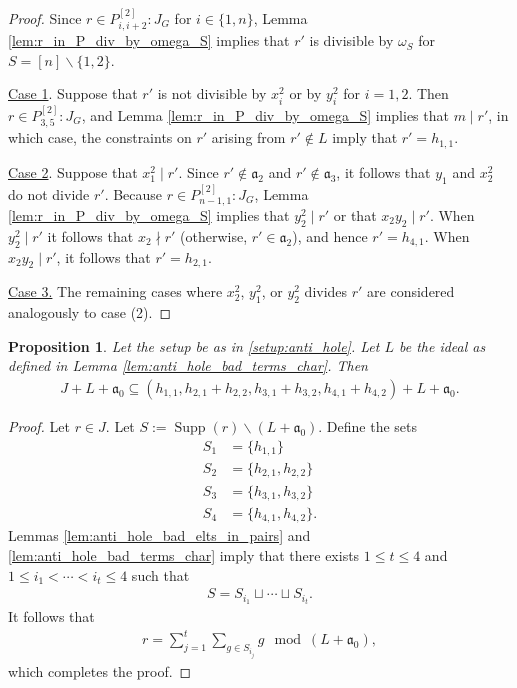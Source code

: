 \documentclass[12pt,a4paper]{amsart}
\theoremstyle{plain}
\newtheorem{prop}[thrm]{Proposition}
\def\bprop{\begin{prop}}
\def\eprop{\end{prop}}
\theoremstyle{definition}
\def\bproof{\begin{proof}}
\def\eproof{\end{proof}}
\theoremstyle{remark}
\let\setminus=\smallsetminus
\def\a{\mathfrak{a}}
\DeclareMathOperator{\Supp}{Supp}
\newcommand{\ul}[1]{\underline{#1}}
\renewcommand{\subset}{\subseteq}
\begin{document}
\bproof
Since $r \in P_{i,i+2}^{[2]}:J_{G}$ for $i \in \{1,n\}$, Lemma \ref{lem:r_in_P_div_by_omega_S} implies that $r'$ is divisible by $\omega_{S}$ for $S = [n] \setminus \{1,2\}$. 

\ul{Case 1}. Suppose that $r'$ is not divisible by $x_{i}^{2}$ or by $y_{i}^{2}$ for $i = 1,2$. Then $r \in P_{3,5}^{[2]}:J_{G}$, and Lemma \ref{lem:r_in_P_div_by_omega_S} implies that $m \mid r'$, in which case, the constraints on $r'$ arising from $r' \notin L$ imply that $r' = h_{1,1}$.

\ul{Case 2}. Suppose that $x_{1}^{2} \mid r'$. Since $r' \notin \a_{2}$ and $r' \notin \a_{3}$, it follows that $y_{1}$ and $x_{2}^{2}$ do not divide $r'$. Because $r \in P_{n-1,1}^{[2]}:J_{G}$, Lemma \ref{lem:r_in_P_div_by_omega_S} implies that $y_{2}^{2} \mid r'$ or that $x_{2}y_{2} \mid r'$. When $y_{2}^{2} \mid r'$ it follows that $x_{2} \nmid r'$ (otherwise, $r' \in \a_{2}$), and hence $r' = h_{4,1}$. When $x_{2}y_{2} \mid r'$, it follows that $r' = h_{2,1}$.

\ul{Case 3.} The remaining cases where $x_{2}^{2}$, $y_{1}^{2}$, or $y_{2}^{2}$ divides $r'$ are considered analogously to case (2).
\eproof

\bprop
\label{prop:J_contained_in_Q} 
Let the setup be as in \ref{setup:anti_hole}. Let $L$ be the ideal as defined in Lemma \ref{lem:anti_hole_bad_terms_char}. Then 
\begin{align*}
    J + L + \a_{0} \subset (h_{1,1},h_{2,1}+h_{2,2},h_{3,1}+h_{3,2},h_{4,1}+h_{4,2}) + L + \a_{0}.
\end{align*}
\eprop  

\bproof
Let $r \in J$. Let $S := \Supp(r) \setminus (L + \a_{0})$. Define the sets
\begin{align*}
    S_{1} &= \{h_{1,1}\} \\
    S_{2} &= \{h_{2,1},h_{2,2}\} \\
    S_{3} &= \{h_{3,1},h_{3,2}\} \\
    S_{4} &= \{h_{4,1},h_{4,2} \}.    
\end{align*}
Lemmas \ref{lem:anti_hole_bad_elts_in_pairs} and \ref{lem:anti_hole_bad_terms_char} imply that there exists $1 \leq t \leq 4$ and $1 \leq i_{1} < \cdots < i_{t} \leq 4$ such that 
\begin{align*}
    S = S_{i_{1}} \sqcup \cdots \sqcup S_{i_{t}}.
\end{align*}
It follows that
\begin{align*}
    r = \sum_{j = 1}^{t} \sum_{g\in S_{i_{j}}} g \mod{(L+\a_{0})},
\end{align*}
which completes the proof.
\eproof
\end{document}
